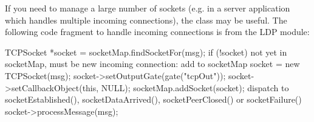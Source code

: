 If you need to manage a large number of sockets (e.g. in a server
application which handles multiple incoming connections), the
 class may be useful. The following code
fragment to handle incoming connections is from the LDP module:

\begin{cpp}
TCPSocket *socket = socketMap.findSocketFor(msg);
if (!socket)
{
    not yet in socketMap, must be new incoming connection: add to socketMap
    socket = new TCPSocket(msg);
    socket->setOutputGate(gate("tcpOut"));
    socket->setCallbackObject(this, NULL);
    socketMap.addSocket(socket);
}
dispatch to socketEstablished(), socketDataArrived(), socketPeerClosed()
or socketFailure()
socket->processMessage(msg);
\end{cpp}

\fi



